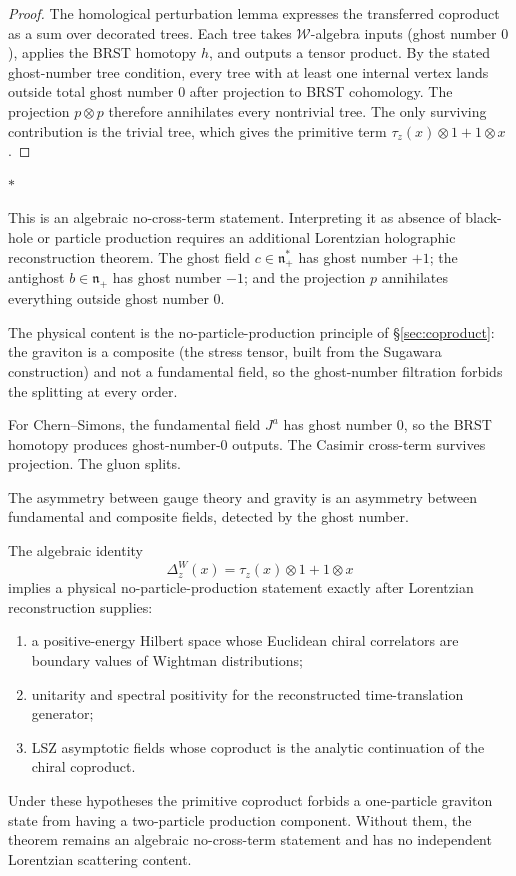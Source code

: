 \documentclass[11pt]{article}
\newcommand{\cW}{\mathcal{W}}
\newcommand{\fn}{\mathfrak{n}}
\newcommand{\sep}{\bigskip\begin{center}$*$\end{center}\medskip}
\begin{document}
\begin{proof}
The homological perturbation lemma expresses the transferred
coproduct as a sum over decorated trees.  Each tree takes
$\cW$-algebra inputs (ghost number $0$), applies the BRST
homotopy $h$, and outputs a tensor product.  By the stated
ghost-number tree condition, every tree with at least one
internal vertex lands outside total ghost number $0$ after
projection to BRST cohomology.  The projection $p\otimes p$
therefore annihilates every nontrivial tree.  The only surviving
contribution is the trivial tree, which gives the primitive term
$\tau_z(x) \otimes 1 + 1 \otimes x$.
\end{proof}

\sep

This is an algebraic no-cross-term statement.  Interpreting it as
absence of black-hole or particle production requires an
additional Lorentzian holographic reconstruction theorem.  The
ghost field $c \in \fn_+^*$ has ghost number $+1$; the antighost
$b \in \fn_+$ has ghost number $-1$; and the projection $p$
annihilates everything outside ghost number $0$.

The physical content is the no-particle-production principle of
\S\ref{sec:coproduct}: the graviton is a composite (the stress
tensor, built from the Sugawara construction) and not a fundamental
field, so the ghost-number filtration forbids the splitting at
every order.

For Chern--Simons, the fundamental field $J^a$ has ghost number
$0$, so the BRST homotopy produces ghost-number-$0$ outputs.
The Casimir cross-term survives projection.  The gluon splits.

The asymmetry between gauge theory and gravity is an asymmetry
between fundamental and composite fields, detected by the ghost
number.

\begin{theorem}
\label{thm:lorentzian-no-production-criterion}
The algebraic identity
\[
\Delta_z^W(x)=\tau_z(x)\otimes 1+1\otimes x
\]
implies a physical no-particle-production statement exactly after
Lorentzian reconstruction supplies:
\begin{enumerate}[label=\textup{(\roman*)},nosep]
\item a positive-energy Hilbert space whose Euclidean chiral
correlators are boundary values of Wightman distributions;
\item unitarity and spectral positivity for the reconstructed
time-translation generator;
\item LSZ asymptotic fields whose coproduct is the analytic
continuation of the chiral coproduct.
\end{enumerate}
Under these hypotheses the primitive coproduct forbids a
one-particle graviton state from having a two-particle production
component.  Without them, the theorem remains an algebraic
no-cross-term statement and has no independent Lorentzian
scattering content.
\end{theorem}
\end{document}
